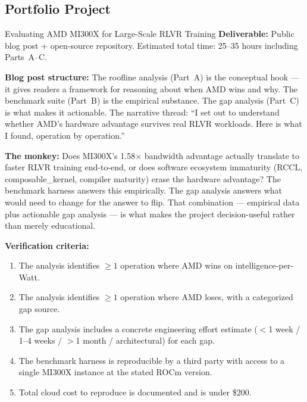\subsection{Portfolio Project}

\begin{portfolio}{Evaluating AMD MI300X for Large-Scale RLVR Training}
\textbf{Deliverable:} Public blog post + open-source repository. Estimated total time: 25--35 hours including Parts~A--C.

\textbf{Blog post structure:} The roofline analysis (Part~A) is the conceptual hook --- it gives readers a framework for reasoning about when AMD wins and why. The benchmark suite (Part~B) is the empirical substance. The gap analysis (Part~C) is what makes it actionable. The narrative thread: ``I set out to understand whether AMD's hardware advantage survives real RLVR workloads. Here is what I found, operation by operation.''

\textbf{The monkey:} Does MI300X's 1.58$\times$ bandwidth advantage actually translate to faster RLVR training end-to-end, or does software ecosystem immaturity (RCCL, composable\_kernel, compiler maturity) erase the hardware advantage? The benchmark harness answers this empirically. The gap analysis answers what would need to change for the answer to flip. That combination --- empirical data plus actionable gap analysis --- is what makes the project decision-useful rather than merely educational.

\textbf{Verification criteria:}
\begin{enumerate}
  \item The analysis identifies $\geq 1$ operation where AMD wins on intelligence-per-Watt.
  \item The analysis identifies $\geq 1$ operation where AMD loses, with a categorized gap source.
  \item The gap analysis includes a concrete engineering effort estimate ($<$1 week / 1--4 weeks / $>$1 month / architectural) for each gap.
  \item The benchmark harness is reproducible by a third party with access to a single MI300X instance at the stated ROCm version.
  \item Total cloud cost to reproduce is documented and is under \$200.
\end{enumerate}
\end{portfolio}

